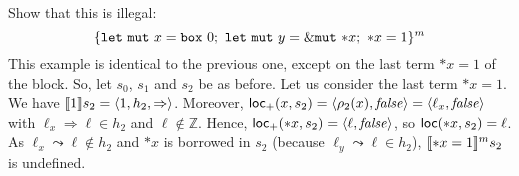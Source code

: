\begin{example}
  Show that this is illegal:
  \[
    \{
      \mathtt{let\ mut}\ x = \mathtt{box}\ 0;\
      \mathtt{let\ mut}\ y = \mutborrow \mathtt{*}x;\
      \mathtt{*}x = 1
    \}^m
  \]
  This example is identical to the previous one, except on the last term
  $*x=1$ of the block. So, let $s_0$, $s_1$ and $s_2$ be as before.
  Let us consider the last term $*x=1$.
  We have $\den[1]{s_2} = \langle 1,h_2,\Rightarrow\rangle$.
  Moreover, $\locread(x,s_2) = \langle\rho_2(x),\mathit{false}\rangle=
  \langle\ell_x,\mathit{false}\rangle$ with $\ell_x\Rightarrow \ell \in h_2$
  and $\ell\not\in\mathbb{Z}$. Hence, $\locread(*x,s_2) =
  \langle\ell,\mathit{false}\rangle$, so $\loc(*x,s_2) = \ell$.
  As $\ell_x\leadsto\ell\not\in h_2$ and $\mathtt{*}x$ is borrowed in $s_2$
  (because $\ell_y\leadsto \ell\in h_2$),
  $\denl[\mathtt{*}x = 1]{m}{s_2}$ is undefined.
\end{example}

